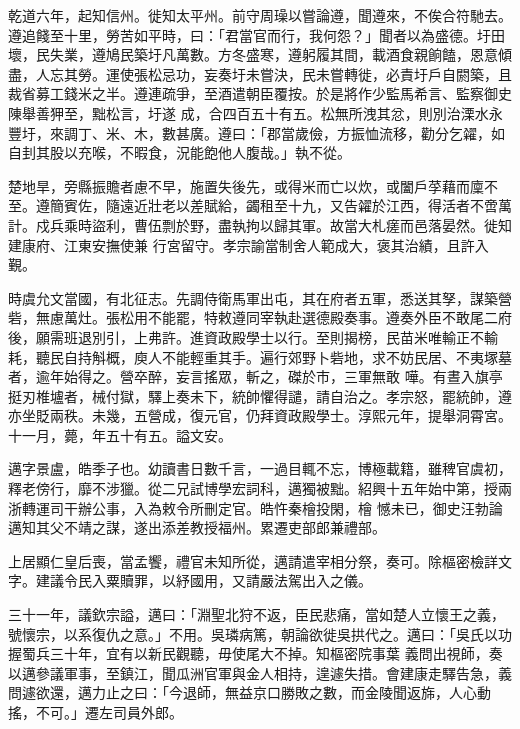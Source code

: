 \begin{pinyinscope}
 乾道六年，起知信州。徙知太平州。前守周璪以嘗論遵，聞遵來，不俟合符馳去。遵追餞至十里，勞苦如平時，曰：「君當官而行，我何怨？」聞者以為盛德。圩田壞，民失業，遵鳩民築圩凡萬數。方冬盛寒，遵躬履其間，載酒食親餉饁，恩意傾盡，人忘其勞。運使張松忌功，妄奏圩未嘗決，民未嘗轉徙，必責圩戶自閼築，且裁省募工錢米之半。遵連疏爭，至酒遣朝臣覆按。於是將作少監馬希言、監察御史陳舉善狎至，黜松言，圩遂
 成，合四百五十有五。松無所洩其忿，則別治溧水永豐圩，來調丁、米、木，數甚廣。遵曰：「郡當歲儉，方振恤流移，勸分乞糴，如自刲其股以充喉，不暇食，況能飽他人腹哉。」執不從。



 楚地旱，旁縣振贍者慮不早，施置失後先，或得米而亡以炊，或闔戶莩藉而廩不至。遵簡賓佐，隨遠近壯老以差賦給，蠲租至十九，又告糴於江西，得活者不啻萬計。戍兵乘時盜利，曹伍剽於野，盡執拘以歸其軍。故當大札瘥而邑落晏然。徙知建康府、江東安撫使兼
 行宮留守。孝宗諭當制舍人範成大，褒其治績，且許入覲。



 時虞允文當國，有北征志。先調侍衛馬軍出屯，其在府者五軍，悉送其孥，謀築營砦，無慮萬灶。張松用不能罷，特敕遵同宰執赴選德殿奏事。遵奏外臣不敢尾二府後，願需班退別引，上弗許。進資政殿學士以行。至則揭榜，民苗米唯輸正不輸耗，聽民自持斛概，庾人不能輕重其手。遍行郊野卜砦地，求不妨民居、不夷塚墓者，逾年始得之。營卒醉，妄言搖眾，斬之，磔於市，三軍無敢
 嘩。有晝入旗亭挺刃椎壚者，械付獄，驛上奏未下，統帥懼得譴，請自治之。孝宗怒，罷統帥，遵亦坐貶兩秩。未幾，五營成，復元官，仍拜資政殿學士。淳熙元年，提舉洞霄宮。十一月，薨，年五十有五。謚文安。



 邁字景盧，皓季子也。幼讀書日數千言，一過目輒不忘，博極載籍，雖稗官虞初，釋老傍行，靡不涉獵。從二兄試博學宏詞科，邁獨被黜。紹興十五年始中第，授兩浙轉運司干辦公事，入為敕令所刪定官。皓忤秦檜投閑，檜
 憾未已，御史汪勃論邁知其父不靖之謀，遂出添差教授福州。累遷吏部郎兼禮部。



 上居顯仁皇后喪，當孟饗，禮官未知所從，邁請遣宰相分祭，奏可。除樞密檢詳文字。建議令民入粟贖罪，以紓國用，又請嚴法駕出入之儀。



 三十一年，議欽宗謚，邁曰：「淵聖北狩不返，臣民悲痛，當如楚人立懷王之義，號懷宗，以系復仇之意。」不用。吳璘病篤，朝論欲徙吳拱代之。邁曰：「吳氏以功握蜀兵三十年，宜有以新民觀聽，毋使尾大不掉。知樞密院事葉
 義問出視師，奏以邁參議軍事，至鎮江，聞瓜洲官軍與金人相持，遑遽失措。會建康走驛告急，義問遽欲還，邁力止之曰：「今退師，無益京口勝敗之數，而金陵聞返旆，人心動搖，不可。」遷左司員外郎。




\end{pinyinscope}

